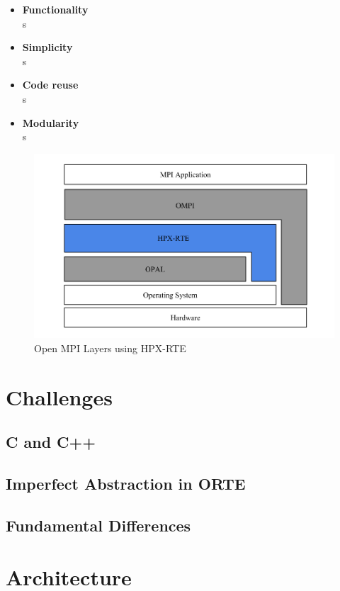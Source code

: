 \begin{itemize}
\item \textbf{Functionality}\\
  s
\item \textbf{Simplicity}\\
  s
\item \textbf{Code reuse}\\
  s
\item \textbf{Modularity}\\
s
\end{itemize}

\begin{figure}[h!]
\centering
\includegraphics[scale=0.4]{images/open-mpi-layers-hpx-rte.png}
\caption[Open MPI Layers using HPX-RTE]{Open MPI Layers using HPX-RTE}
\label{fig:open-mpi-layers-hpx-rte}
\end{figure}

\section{Challenges}
\label{sec:challenges}

\subsection{C and C++}
\subsection{Imperfect Abstraction in ORTE}
\subsection{Fundamental Differences}

\section{Architecture}
\label{sec:architecture}

